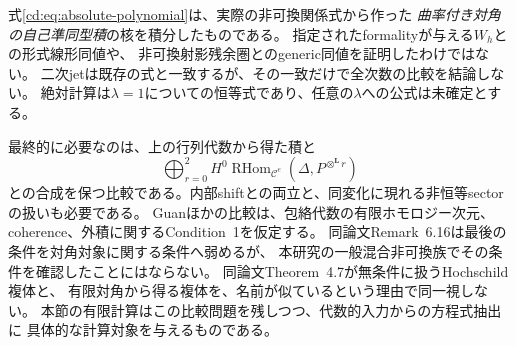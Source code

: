 \begin{remark}[何を決定したか]
式\eqref{cd:eq:absolute-polynomial}は、実際の非可換関係式から作った
\emph{曲率付き対角の自己準同型積}の核を積分したものである。
指定されたformalityが与える$W_h$との形式線形同値や、
非可換射影残余圏とのgeneric同値を証明したわけではない。
二次jetは既存の式と一致するが、その一致だけで全次数の比較を結論しない。
絶対計算は$\lambda=1$についての恒等式であり、任意の$\lambda$への公式は未確定とする。
\end{remark}

最終的に必要なのは、上の行列代数から得た積と
\[
 \bigoplus_{r=0}^2H^0\operatorname{RHom}_{\mathcal C^e}
        (\Delta,P^{\otimes^{\mathbf L}r})
\]
との合成を保つ比較である。内部shiftとの両立と、同変化に現れる非恒等sectorの扱いも必要である。
Guanほか\cite[Theorem~6.14]{CDGHLR}の比較は、包絡代数の有限ホモロジー次元、
coherence、外積に関するCondition~1を仮定する。
同論文Remark~6.16は最後の条件を対角対象に関する条件へ弱めるが、
本研究の一般混合非可換族でその条件を確認したことにはならない。
同論文Theorem~4.7が無条件に扱うHochschild複体と、
有限対角から得る複体を、名前が似ているという理由で同一視しない。
本節の有限計算はこの比較問題を残しつつ、代数的入力からの方程式抽出に
具体的な計算対象を与えるものである。
